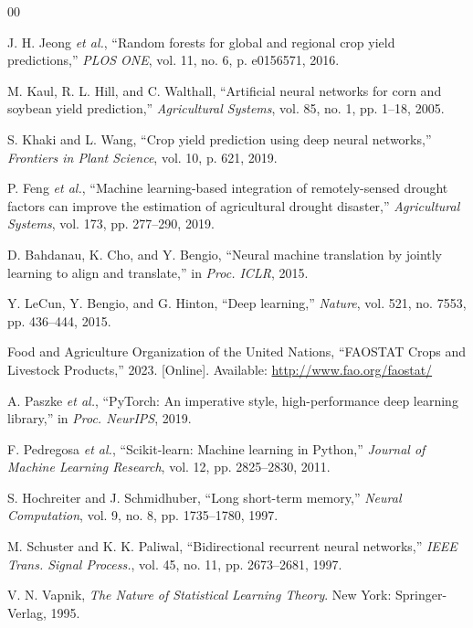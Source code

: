 \documentclass[conference]{IEEEtran}
\begin{document}

\begin{thebibliography}{00}

J. H. Jeong \textit{et al.},
``Random forests for global and regional crop yield predictions,''
\textit{PLOS ONE}, vol. 11, no. 6, p. e0156571, 2016.

M. Kaul, R. L. Hill, and C. Walthall,
``Artificial neural networks for corn and soybean yield prediction,''
\textit{Agricultural Systems}, vol. 85, no. 1, pp. 1--18, 2005.

S. Khaki and L. Wang,
``Crop yield prediction using deep neural networks,''
\textit{Frontiers in Plant Science}, vol. 10, p. 621, 2019.

P. Feng \textit{et al.},
``Machine learning-based integration of remotely-sensed drought factors can improve the estimation of agricultural drought disaster,''
\textit{Agricultural Systems}, vol. 173, pp. 277--290, 2019.

D. Bahdanau, K. Cho, and Y. Bengio,
``Neural machine translation by jointly learning to align and translate,''
in \textit{Proc. ICLR}, 2015.

Y. LeCun, Y. Bengio, and G. Hinton,
``Deep learning,''
\textit{Nature}, vol. 521, no. 7553, pp. 436--444, 2015.

Food and Agriculture Organization of the United Nations,
``FAOSTAT Crops and Livestock Products,''
2023. [Online]. Available: \url{http://www.fao.org/faostat/}

A. Paszke \textit{et al.},
``PyTorch: An imperative style, high-performance deep learning library,''
in \textit{Proc. NeurIPS}, 2019.

F. Pedregosa \textit{et al.},
``Scikit-learn: Machine learning in Python,''
\textit{Journal of Machine Learning Research}, vol. 12, pp. 2825--2830, 2011.

S. Hochreiter and J. Schmidhuber,
``Long short-term memory,''
\textit{Neural Computation}, vol. 9, no. 8, pp. 1735--1780, 1997.

M. Schuster and K. K. Paliwal,
``Bidirectional recurrent neural networks,''
\textit{IEEE Trans. Signal Process.}, vol. 45, no. 11, pp. 2673--2681, 1997.

V. N. Vapnik,
\textit{The Nature of Statistical Learning Theory}.
New York: Springer-Verlag, 1995.

\end{thebibliography}
\end{document}

